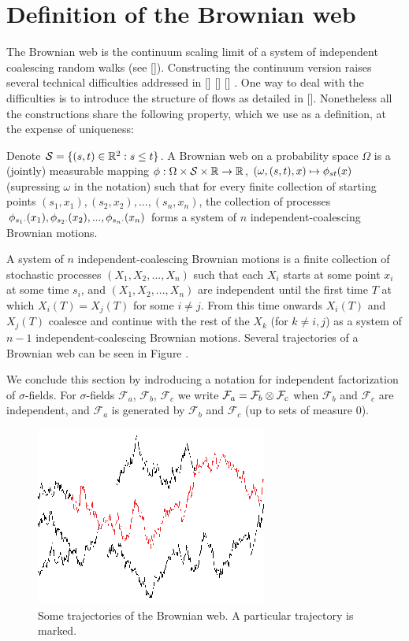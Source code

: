 {
\section{Definition of the Brownian web}
\label{sec:brownian-web-definition}

The Brownian web is the continuum scaling limit of a system of
independent coalescing random walks (see []).  Constructing the
continuum version raises several technical difficulties addressed in
[] [] [] . One way to deal with the difficulties is to introduce the
structure of flows as detailed in [].  Nonetheless all the
constructions share the following property, which we use as a
definition, at the expense of uniqueness:

  Denote $\mathcal{S}=\{(s, t) \in \mathbb{R}^2 : s \le t\}$.
  A Brownian web on a probability space $\Omega$ is a (jointly)
  measurable mapping $\phi : \Omega \times \mathcal{S} \times \mathbb{R}
  \to \mathbb{R}$, $(\omega, (s, t), x) \mapsto \phi_{{s}{t}}(x)$ (supressing
  $\omega$ in the notation) such that for every finite collection of
  starting points $(s_1, x_1),(s_2, x_2),...,(s_n, x_n)$, the
  collection of processes $\phi_{{s_1}{\cdot}}(x_1),
  \phi_{{s_2}{\cdot}}(x_2),...,\phi_{{s_n}{\cdot}}(x_n)$
  forms a system of $n$ independent-coalescing Brownian motions.

  A system of $n$ independent-coalescing Brownian motions is a finite
  collection of stochastic processes $(X_1, X_2,...,X_n)$ such that
  each $X_i$ starts at some point $x_i$ at some time $s_i$, and $(X_1,
  X_2,...,X_n)$ are independent until the first time $T$ at which
  $X_i(T)=X_j(T)$ for some $i\neq j$. From this time onwards $X_i(T)$
  and $X_j(T)$ coalesce and continue with the rest of the $X_k$ (for
  $k\neq i,j$) as a system of $n-1$ independent-coalescing Brownian motions.
  Several trajectories of a Brownian web can be seen in Figure
  .

  \newcommand{\F}{\mathcal{F}}
We conclude this section by indroducing a notation for independent
factorization of $\sigma$-fields.
  For $\sigma$-fields $\F_a$, $\F_b$, $\F_c$ we write $\F_a = \F_b
  \tensor \F_c$ when $\F_b$ and $\F_c$ are independent, and $\F_a$
  is generated by $\F_b$ and $\F_c$ (up to sets of measure $0$).

\begin{figure}
   \centering
   \includegraphics[scale=2]{sometraj.eps}
   \caption{Some trajectories of the Brownian web. A particular trajectory is marked.}
\end{figure}
  \label{fig:bw-trajectories}
}
